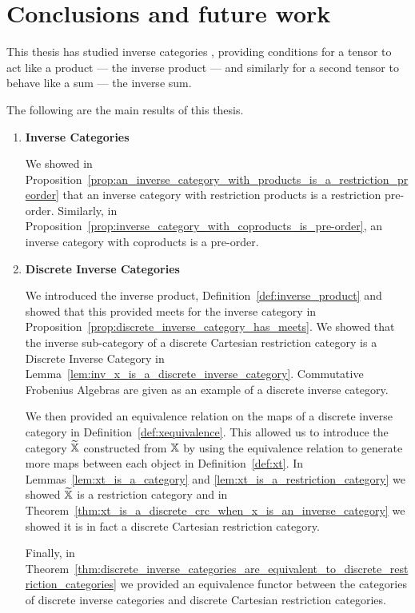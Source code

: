 \chapter{Conclusions and future work} %
\label{cha:conclusions_and_future_work}

This thesis has studied inverse categories \cite{cockett2002:restcategories1}, providing conditions
for a tensor to act like a product --- the inverse product --- and similarly for a second
tensor to behave like a sum --- the inverse sum.

The following are the main results of this thesis.

\begin{enumerate}
\item \textbf{Inverse Categories}

We showed in Proposition~\ref{prop:an_inverse_category_with_products_is_a_restriction_preorder} that
an inverse category with restriction products is a restriction pre-order. Similarly, in
Proposition~\ref{prop:inverse_category_with_coproducts_is_pre-order}, an inverse category with
coproducts is a pre-order.

\item \textbf{Discrete Inverse Categories}

We introduced the inverse product, Definition~\ref{def:inverse_product} and showed that this
provided meets for the inverse category in
Proposition~\ref{prop:discrete_inverse_category_has_meets}. We showed that the inverse sub-category
of a discrete Cartesian restriction category is a Discrete Inverse Category in
Lemma~\ref{lem:inv_x_is_a_discrete_inverse_category}. Commutative Frobenius Algebras are given as an
example of a discrete inverse category.

We then provided an equivalence relation on the maps of a discrete inverse category \X in
Definition~\ref{def:xequivalence}. This allowed us to introduce the category $\widetilde{\mathbb{X}}$ constructed from
$\mathbb{X}$ by using the equivalence relation to generate more maps between each object in
Definition~\ref{def:xt}. In Lemmas~\ref{lem:xt_is_a_category} and
\ref{lem:xt_is_a_restriction_category} we showed $\widetilde{\mathbb{X}}$ is a restriction category and in
Theorem~\ref{thm:xt_is_a_discrete_crc_when_x_is_an_inverse_category} we showed it is in fact a
discrete Cartesian restriction category.

Finally, in
Theorem~\ref{thm:discrete_inverse_categories_are_equivalent_to_discrete_restriction_categories} we
provided an equivalence functor between the categories of discrete inverse categories and discrete
Cartesian restriction categories.


\end{enumerate}
